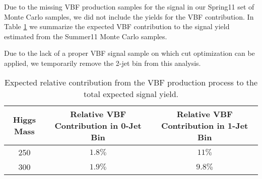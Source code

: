 Due to the missing VBF production samples for the signal in our Spring11 set of 
Monte Carlo samples,  we did not include the yields for the VBF contribution. 
In Table \ref{tab:VBFSignalContribution} we summarize the expected VBF contribution to the signal yield
estimated from the Summer11 Monte Carlo samples.

Due to the lack of a proper VBF signal sample on which cut optimization can be 
applied, we temporarily remove the 2-jet bin from this analysis.

\begin{table}[!ht]
\begin{center}
\begin{tabular}{|c|c|c|}
\hline
Higgs Mass        & Relative VBF Contribution in 0-Jet Bin & Relative VBF Contribution in 1-Jet Bin \\ 
\hline 
250               & $1.8\%$                                & $11\%$                                 \\ 
300               & $1.9\%$                                & $9.8\%$                                \\ 
\hline 
\end{tabular}
\caption{Expected relative contribution from the VBF production process to the total
expected signal yield.}
\label{tab:VBFSignalContribution}
\end{center}
\end{table}






